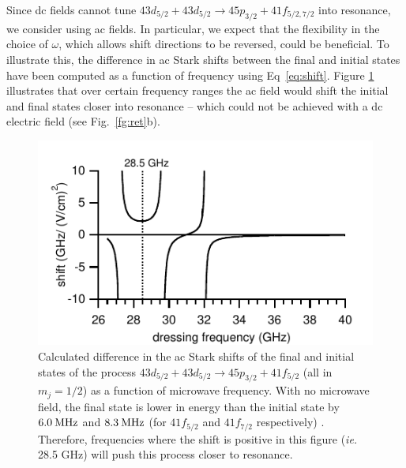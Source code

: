 \documentclass[letterpaper,twocolumn,showpacs,preprintnumbers,amsmath,amssymb,prl,nolongbibliography]{revtex4-2}
\begin{document}
Since dc fields cannot tune
$43d_{5/2} + 43d_{5/2} \rightarrow 45p_{3/2} + 41f_{5/2,7/2}$
into resonance, we consider using ac fields.
In particular, we expect that the flexibility in the choice
of $\omega$, which allows shift directions to be reversed, could
be beneficial.
To illustrate this,
the difference in ac Stark shifts between the final
and initial states have been computed
as a function of frequency using Eq~\ref{eq:shift}.
Figure \ref{fg:ifcalc} illustrates that over certain frequency ranges
the ac field would shift the initial and final states closer into
resonance
-- which could not be achieved with a dc
electric field (see Fig.~\ref{fg:ret}b).

\begin{figure}
\includegraphics{fig3.pdf}
\caption{\label{fg:ifcalc} Calculated difference in the ac Stark shifts
of the final and initial states of the process
$43d_{5/2} + 43d_{5/2} \rightarrow 45p_{3/2} + 41f_{5/2}$
(all in $m_j=1/2$)
as a function of microwave frequency.  With no
microwave field, the final state is lower in energy than the
initial state
by $6.0 \: {\rm MHz}$ and $8.3 \: {\rm MHz}$
(for $41f_{5/2}$ and $41f_{7/2}$ respectively)
\cite{li:2003,han:2006}.  Therefore, frequencies where the shift
is positive in this figure ({\it ie.} 28.5 GHz)
will push this process closer to resonance.
}
\end{figure}
\end{document}
